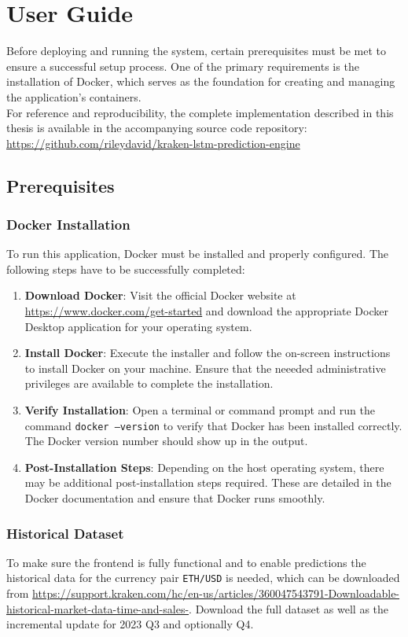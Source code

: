 \chapter{User Guide}
Before deploying and running the system, certain prerequisites must be met to ensure a successful setup process. One of the primary requirements is the installation of Docker, which serves as the foundation for creating and managing the application's containers.
\newline
\\
For reference and reproducibility, the complete implementation described in this thesis is available in the accompanying source code repository: 
\url{https://github.com/rileydavid/kraken-lstm-prediction-engine}

\section{Prerequisites}

\subsection{Docker Installation}
To run this application, Docker must be installed and properly configured. The following steps have to be successfully completed:

\begin{enumerate}
    \item \textbf{Download Docker}: Visit the official Docker website at \url{https://www.docker.com/get-started} and download the appropriate Docker Desktop application for your operating system.
    \item \textbf{Install Docker}: Execute the installer and follow the on-screen instructions to install Docker on your machine. Ensure that the neeeded administrative privileges are available to complete the installation.
    \item \textbf{Verify Installation}: Open a terminal or command prompt and run the command \texttt{docker ---version} to verify that Docker has been installed correctly. The Docker version number should show up in the output.
    \item \textbf{Post-Installation Steps}: Depending on the host operating system, there may be additional post-installation steps required. These are detailed in the Docker documentation and ensure that Docker runs smoothly.
\end{enumerate}

\subsection{Historical Dataset}
\label{section:historical_dataset}
To make sure the frontend is fully functional and to enable predictions the historical data for the currency pair \texttt{ETH/USD} is needed, which can be downloaded from \url{https://support.kraken.com/hc/en-us/articles/360047543791-Downloadable-historical-market-data-time-and-sales-}. Download the full dataset as well as the incremental update for 2023 Q3 and optionally Q4. 

